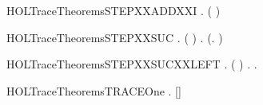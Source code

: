 \newcommand{\HOLTraceTheoremsSTEPXXADDXXEQN}{\UseVerbatim{HOLTraceTheoremsSTEPXXADDXXEQN}}
\begin{SaveVerbatim}{HOLTraceTheoremsSTEPXXADDXXI}
\HOLTokenTurnstile{} \HOLSymConst{\HOLTokenForall{}}    .     \HOLSymConst{\HOLTokenConj{}}     \HOLSymConst{\HOLTokenImp{}}   ( \HOLSymConst{+} ) 
\end{SaveVerbatim}
\newcommand{\HOLTraceTheoremsSTEPXXADDXXI}{\UseVerbatim{HOLTraceTheoremsSTEPXXADDXXI}}
\begin{SaveVerbatim}{HOLTraceTheoremsSTEPXXSUC}
\HOLTokenTurnstile{} \HOLSymConst{\HOLTokenForall{}}  .   ( )  \HOLSymConst{\HOLTokenEquiv{}} \HOLSymConst{\HOLTokenExists{}}. (\HOLSymConst{\HOLTokenExists{}}.  \HOLTokenTransBegin{}\HOLTokenTransEnd {}) \HOLSymConst{\HOLTokenConj{}}    
\end{SaveVerbatim}
\newcommand{\HOLTraceTheoremsSTEPXXSUC}{\UseVerbatim{HOLTraceTheoremsSTEPXXSUC}}
\begin{SaveVerbatim}{HOLTraceTheoremsSTEPXXSUCXXLEFT}
\HOLTokenTurnstile{} \HOLSymConst{\HOLTokenForall{}}  .   ( )  \HOLSymConst{\HOLTokenEquiv{}} \HOLSymConst{\HOLTokenExists{}}.     \HOLSymConst{\HOLTokenConj{}} \HOLSymConst{\HOLTokenExists{}}.  \HOLTokenTransBegin{}\HOLTokenTransEnd {}
\end{SaveVerbatim}
\newcommand{\HOLTraceTheoremsSTEPXXSUCXXLEFT}{\UseVerbatim{HOLTraceTheoremsSTEPXXSUCXXLEFT}}
\begin{SaveVerbatim}{HOLTraceTheoremsTRACEOne}
\HOLTokenTurnstile{} \HOLSymConst{\HOLTokenForall{}}  .  \HOLTokenTransBegin{}\HOLTokenTransEnd {} \HOLSymConst{\HOLTokenImp{}}   [] 
\end{SaveVerbatim}
